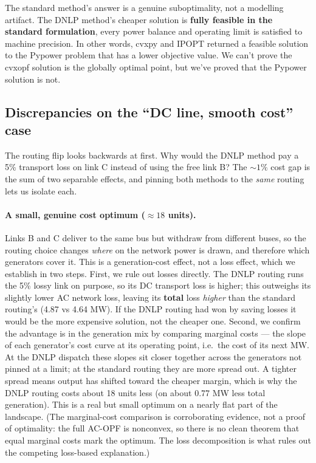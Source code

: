 \documentclass[11pt]{article}
\begin{document}
The standard method's answer is a genuine suboptimality, not a modelling
artifact. The DNLP method's cheaper solution is \textbf{fully feasible in the
standard formulation}, every power balance and operating limit is satisfied to
machine precision. In other words, cvxpy and IPOPT returned a feasible solution
to the Pypower problem that has a lower objective value. We can't prove the
cvxopf solution is the globally optimal point, but we've proved that the Pypower
solution is not.

\subsection{Discrepancies on the ``DC line, smooth cost'' case}

The routing flip looks backwards at first. Why would the DNLP method pay a 5\%
transport loss on link C instead of using the free link B? The ${\sim}1\%$ cost
gap is the sum of two separable effects, and pinning both methods to the
\emph{same} routing lets us isolate each.

\paragraph{A small, genuine cost optimum ($\approx 18$ units).} Links B and C
deliver to the same bus but withdraw from different buses, so the routing choice
changes \emph{where} on the network power is drawn, and therefore which
generators cover it. This is a generation-cost effect, not a loss effect, which
we establish in two steps. First, we rule out losses directly. The DNLP routing
runs the 5\% lossy link on purpose, so its DC transport loss is higher; this
outweighs its slightly lower AC network loss, leaving its \textbf{total} loss
\emph{higher} than the standard routing's (4.87 vs 4.64 MW). If the DNLP routing
had won by saving losses it would be the more expensive solution, not the
cheaper one. Second, we confirm the advantage is in the generation mix by
comparing marginal costs --- the slope of each generator's cost curve at its
operating point, i.e.\ the cost of its next MW. At the DNLP dispatch these
slopes sit closer together across the generators not pinned at a limit; at the
standard routing they are more spread out. A tighter spread means output has
shifted toward the cheaper margin, which is why the DNLP routing costs about 18
units less (on about 0.77 MW less total generation). This is a real but small
optimum on a nearly flat part of the landscape. (The marginal-cost comparison is
corroborating evidence, not a proof of optimality: the full AC-OPF is nonconvex,
so there is no clean theorem that equal marginal costs mark the optimum. The
loss decomposition is what rules out the competing loss-based explanation.)
\end{document}
